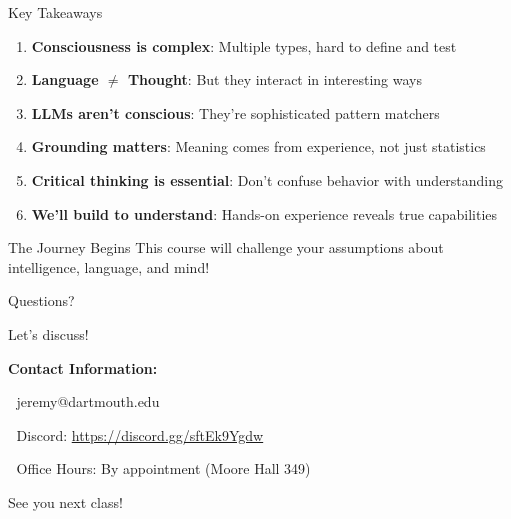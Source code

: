 \documentclass[aspectratio=169]{beamer}
\begin{document}
\begin{frame}[shrink=10]{Key Takeaways 🔑}
\small
\begin{enumerate}\setlength{\itemsep}{0pt}\setlength{\itemsep}{0pt}
    \item \textbf{Consciousness is complex}: Multiple types, hard to define and test
    \item \textbf{Language $\neq$ Thought}: But they interact in interesting ways
    \item \textbf{LLMs aren't conscious}: They're sophisticated pattern matchers
    \item \textbf{Grounding matters}: Meaning comes from experience, not just statistics
    \item \textbf{Critical thinking is essential}: Don't confuse behavior with understanding
    \item \textbf{We'll build to understand}: Hands-on experience reveals true capabilities
\end{enumerate}

\vspace{0.3cm}

\begin{alertblock}{The Journey Begins}
This course will challenge your assumptions about intelligence, language, and mind!
\end{alertblock}
\end{frame}

\begin{frame}{Questions? 🤔}
\begin{center}
\Large{Let's discuss!}

\vspace{0.5cm}

\textbf{Contact Information:}

📧 jeremy@dartmouth.edu

💬 Discord: \href{https://discord.gg/sftEk9Ygdw}{https://discord.gg/sftEk9Ygdw}

🏢 Office Hours: By appointment (Moore Hall 349)

\vspace{0.5cm}

\large{See you next class! 🚀}
\end{center}
\end{frame}
\end{document}
